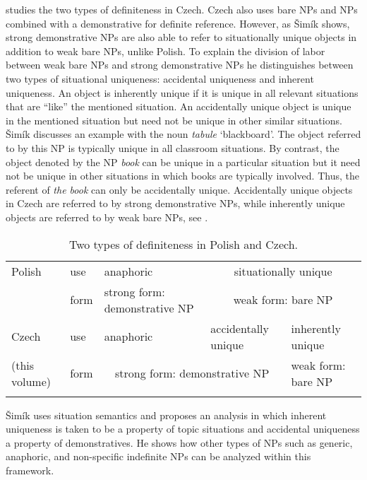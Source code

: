 \documentclass[output=paper,
colorlinks,
citecolor=brown,
newtxmath
]{langscibook}
\begin{document}
 studies the two types of definiteness in Czech. Czech also uses bare NPs and NPs combined with a demonstrative for definite reference. However, as Šimík shows, strong demonstrative NPs are also able to refer to situationally unique objects in addition to weak bare NPs, unlike Polish. To explain the division of labor between weak bare NPs and strong demonstrative NPs he distinguishes between two types of situational uniqueness: accidental uniqueness and inherent uniqueness. An object is inherently unique if it is unique in all relevant situations that are ``like'' the mentioned situation. An accidentally unique object is unique in the mentioned situation but need not be unique in other similar situations. Šimík discusses an example with the noun \textit{tabule} `blackboard'. The object referred to by this NP is typically unique in all classroom situations. By contrast, the object denoted by the NP \textit{book} can be unique in a particular situation but it need not be unique in other situations in which books are typically involved. Thus, the referent of \textit{the book} can only be accidentally unique. Accidentally unique objects in Czech are referred to by strong demonstrative NPs, while inherently unique objects are referred to by weak bare NPs, see .

\begin{table}
\centering
\begin{tabularx}{\textwidth}{X|X|X|X|X}
\lsptoprule
Polish & use &  anaphoric  &  \multicolumn{2}{c}{situationally unique} \tabularnewline \cline{2-5}
\citep{Czardybon2017}  & form  &    strong form: demonstrative NP       & \multicolumn{2}{c}{weak form: bare NP}            \tabularnewline \hline
Czech & use &    anaphoric       &      accidentally unique     & inherently unique \tabularnewline \cline{2-5}
\citeauthor{Simik2021} (this volume) & form & \multicolumn{2}{c|}{strong form: demonstrative NP} & weak form: bare NP \tabularnewline
\lspbottomrule
\end{tabularx}
\caption{Two types of definiteness in Polish and Czech.}
\label{table:2}
\end{table}

Šimík uses situation semantics and proposes an analysis in which inherent unique\-ness is taken to be a property of topic situations and accidental unique\-ness a property of demonstratives. He shows how other types of NPs such as generic, anaphoric, and non-specific indefinite NPs can be analyzed within this framework.
\end{document}
